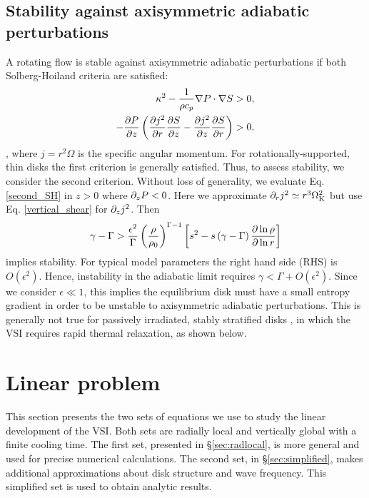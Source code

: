 \subsection{Stability against axisymmetric adiabatic
  perturbations}\label{solberg}
A rotating flow is stable against axisymmetric adiabatic perturbations
if both Solberg-Hoiland criteria  are satisfied:
\begin{align}
  \kappa^2 - \frac{1}{\rho c_p}\nabla P \cdot \nabla S &> 0,\\
  -\frac{\partial P}{\partial z}\left(\frac{\partial j^2}{\partial r}\frac{\partial S}{ \partial z} -
    \frac{\partial j^2}{\partial z}\frac{\partial S}{\partial r} \right)&>0. \label{second_SH} 
\end{align}
\citep{tassoul78}, where $j=r^2\Omega$ is the specific angular
momentum. For rotationally-supported, thin disks %
the first criterion is generally satisfied. 
Thus, to assess stability, we consider the second
criterion. 
Without loss of generality, we evaluate Eq. \ref{second_SH} in $z>0$
where $\partial_zP<0$. Here we approximate $\partial_r j^2\simeq r^3\Omega_{\rm K}^2$ but
use Eq. \ref{vertical_shear} for $\partial_zj^2$. Then 
\begin{align}\label{solberg2}
  \gamma - \Gamma > \frac{\epsilon^2}{\Gamma}
  \left(\frac{\rho}{\rho_0}\right)^{\Gamma-1} \left[s^2
    -s\left(\gamma-\Gamma\right)\frac{\partial\ln{\rho}}{\partial\ln{r}} \right]
\end{align} 
implies stability. For typical model parameters the right hand
side (RHS) is $O(\epsilon^2)$. Hence, instability in the adiabatic limit  
requires $\gamma < \Gamma + O(\epsilon^2)$. Since we consider
$\epsilon\ll1$, this implies the equilibrium disk must have a small
entropy gradient in order to be unstable to axisymmetric adiabatic
perturbations. This is generally not true for passively irradiated, stably
stratified disks \citep{chiang97}, in which the VSI requires rapid
thermal relaxation, as shown below. 

\section{Linear problem}\label{linear} 
This section presents the two sets of equations we use to study the
linear development of the VSI.  Both sets are radially local and vertically global 
with a finite cooling time.
The first set, presented in \S\ref{sec:radlocal}, is more general and used 
for precise numerical calculations.  The second set, in \S\ref{sec:simplified}, makes
additional approximations  about disk structure and wave frequency.  This simplified
set is used to obtain analytic results.


